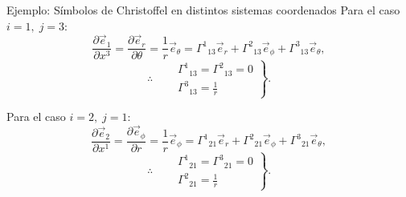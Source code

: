 \documentclass[../apunte_mecanica_clasica.tex]{subfiles}%
\begin{document}
\begin{apuntebloque}{Ejemplo: Símbolos de Christoffel en distintos sistemas coordenados}
Para el caso $i=1, \; j=3$:
\begin{equation*}
    \frac{\partial \vec{e}_1}{\partial x^3} =\frac{\partial \vec{e}_r}{\partial \theta} = \frac{1}{r}\vec{e}_\theta
    = \Gamma^1{}_{13}\vec{e}_r + \Gamma^2{}_{13}\vec{e}_\phi + \Gamma^3{}_{13}\vec{e}_\theta,
\end{equation*}
\begin{equation*}
    \therefore \quad 
    \left.
    \begin{aligned}
        &\Gamma^1{}_{13} =\Gamma^2{}_{13} = 0 \\
        &\Gamma^3{}_{13} = \tfrac{1}{r}
    \end{aligned}
    \right\}.
\end{equation*}

Para el caso $i=2, \; j=1$:
\begin{equation*}
    \frac{\partial \vec{e}_2}{\partial x^1} =\frac{\partial \vec{e}_\phi}{\partial r} = \frac{1}{r}\vec{e}_\phi
    = \Gamma^1{}_{21}\vec{e}_r + \Gamma^2{}_{21}\vec{e}_\phi + \Gamma^3{}_{21}\vec{e}_\theta,
\end{equation*}
\begin{equation*}
    \therefore \quad 
    \left.
    \begin{aligned}
        &\Gamma^1{}_{21} =\Gamma^3{}_{21} = 0 \\
        &\Gamma^2{}_{21} = \tfrac{1}{r}
    \end{aligned}
    \right\}.
\end{equation*}

\end{apuntebloque}
\end{document}
